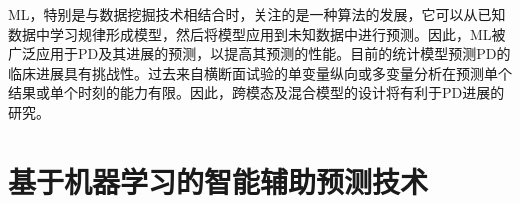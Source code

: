 
ML，特别是与数据挖掘技术相结合时，关注的是一种算法的发展，它可以从已知数据中学习规律形成模型，然后将模型应用到未知数据中进行预测\cite{kuang2015comparison}。因此，ML被广泛应用于PD及其进展的预测，以提高其预测\cite{hill2017parkinson,2018A,2020Machine}的性能。目前的统计模型预测PD的临床进展具有挑战性。过去来自横断面试验的单变量纵向或多变量分析在预测单个结果或单个时刻的能力有限\cite{2017Predicting}。因此，跨模态及混合模型的设计将有利于PD进展的研究。

\section{基于机器学习的智能辅助预测技术}\label{chapter5.1:pdPredictReview}

